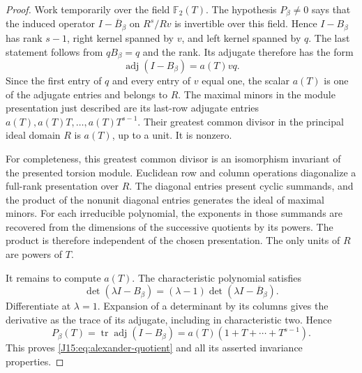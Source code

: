 \documentclass[11pt,oneside]{report}
\theoremstyle{definition}
\numberwithin{equation}{section}
\begin{document}
\begin{proof}
Work temporarily over the field $\mathbb F_2(T)$.
The hypothesis $P_\beta\ne0$ says that the induced operator
$I-\overline B_\beta$ on $R^s/Rv$ is invertible over this field.
Hence $I-B_\beta$ has rank $s-1$, right kernel spanned by $v$,
and left kernel spanned by $q$. The last statement follows from
$qB_\beta=q$ and the rank. Its adjugate therefore has the form
\[
 \operatorname{adj}(I-B_\beta)=a(T)vq.
\]
Since the first entry of $q$ and every entry of $v$ equal one,
the scalar $a(T)$ is one of the adjugate entries and belongs to
$R$. The maximal minors in the module presentation just described
are its last-row adjugate entries
$a(T),a(T)T,\ldots,a(T)T^{s-1}$.
Their greatest common divisor in the principal ideal domain $R$
is $a(T)$, up to a unit. It is nonzero.

For completeness, this greatest common divisor is an isomorphism
invariant of the presented torsion module. Euclidean row and column
operations diagonalize a full-rank presentation over $R$.
The diagonal entries present cyclic summands, and the product of
the nonunit diagonal entries generates the ideal of maximal minors.
For each irreducible polynomial, the exponents in those summands
are recovered from the dimensions of the successive quotients by
its powers. The product is therefore independent of the chosen
presentation. The only units of $R$ are powers of $T$.

It remains to compute $a(T)$. The characteristic polynomial satisfies
\[
 \det(\lambda I-B_\beta)
   =(\lambda-1)\det(\lambda I-\overline B_\beta).
\]
Differentiate at $\lambda=1$. Expansion of a determinant by its
columns gives the derivative as the trace of its adjugate, including
in characteristic two. Hence
\[
 P_\beta(T)=\operatorname{tr}\operatorname{adj}(I-B_\beta)
    =a(T)(1+T+\cdots+T^{s-1}).
\]
This proves \eqref{J15:eq:alexander-quotient} and all its asserted
invariance properties.
\end{proof}
\end{document}

